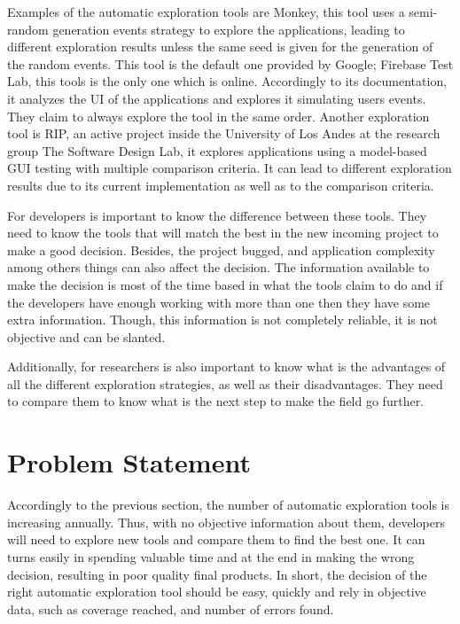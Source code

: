 Examples of the automatic exploration tools are Monkey, this tool uses a semi-random generation events strategy to explore the applications, leading to different exploration results unless the same seed is given for the generation of the random events. This tool is the default one provided by Google; Firebase Test Lab, this tools is the only one which is online. Accordingly to its documentation, it analyzes the UI of the applications and explores it simulating users events. They claim to always explore the tool in the same order. Another exploration tool is RIP, an active project inside the University of Los Andes at the research group The Software Design Lab, it explores applications using a model-based GUI testing with multiple comparison criteria. It can lead to different exploration results due to its current implementation as well as to the comparison criteria. 

For developers is important to know the difference between these tools. They need to know the tools that will match the best in the new incoming project to make a good decision. Besides, the project bugged, and application complexity among others things can also affect the decision. The information available to make the decision is most of the time based in what the tools claim to do and if the developers have enough working with more than one then they have some extra information. Though, this information is not completely reliable, it is not objective and can be slanted.

Additionally, for researchers is also important to know what is the advantages of all the different exploration strategies, as well as their disadvantages. They need to compare them to know what is the next step to make the field go further.


\section{Problem Statement}

Accordingly to the previous section, the number of automatic exploration tools is increasing annually. Thus, with no objective information about them, developers  will need to explore new tools and compare them to find the best one. It can turns easily in spending valuable time and at the end in making the wrong decision, resulting in poor quality final products. In short, the decision of the right automatic exploration tool should be easy, quickly and rely in objective data, such as coverage reached, and number of errors found.

